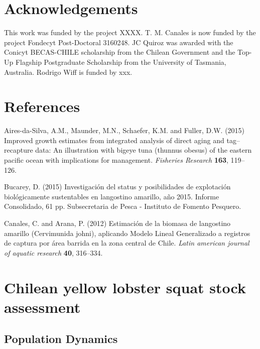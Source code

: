 \documentclass[11pt,letter,]{article}
\begin{document}
\section{Acknowledgements}\label{acknowledgements}

This work was funded by the project XXXX. T. M. Canales is now funded by
the project Fondecyt Post-Doctoral 3160248. JC Quiroz was awarded with
the Conicyt BECAS-CHILE scholarship from the Chilean Government and the
Top-Up Flagship Postgraduate Scholarship from the University of
Tasmania, Australia. Rodrigo Wiff is funded by xxx.

\section{References}\label{references}

\setlength{\parindent}{0cm} \fontsize{9}{10}\selectfont
\setlength{\parskip}{0.8em}

\hypertarget{refs}{}
\hypertarget{ref-aires2015improved}{}
Aires-da-Silva, A.M., Maunder, M.N., Schaefer, K.M. and Fuller, D.W.
(2015) Improved growth estimates from integrated analysis of direct
aging and tag--recapture data: An illustration with bigeye tuna (thunnus
obesus) of the eastern pacific ocean with implications for management.
\emph{Fisheries Research} \textbf{163}, 119--126.

\hypertarget{ref-bucarey2015}{}
Bucarey, D. (2015) Investigación del status y posibilidades de
explotación biológicamente sustentables en langostino amarillo, año
2015. Informe Consolidado, 61 pp. Subsecretaria de Pesca - Instituto de
Fomento Pesquero.

\hypertarget{ref-canalesArana2012}{}
Canales, C. and Arana, P. (2012) Estimación de la biomasa de langostino
amarillo (Cervimunida johni), aplicando Modelo Lineal Generalizado a
registros de captura por área barrida en la zona central de Chile.
\emph{Latin american journal of aquatic research} \textbf{40}, 316--334.

\setlength{\parindent}{25pt}
\setlength{\parskip}{0em}
\fontsize{11}{14}\selectfont

\clearpage

\appendix
\section{Chilean yellow lobster squat stock assessment} \label{app:model}
\subsection{Population Dynamics}
\end{document}

